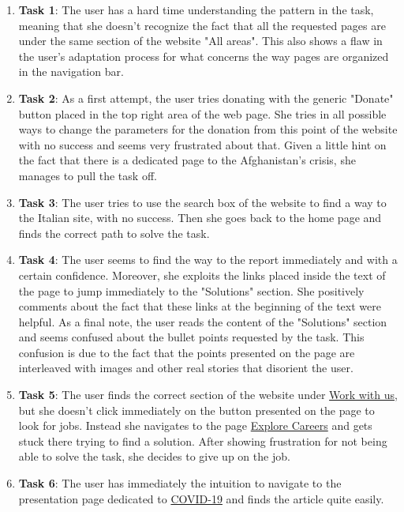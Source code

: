 \begin{enumerate}
	\item \textbf{Task 1}: The user has a hard time understanding the pattern in the task, meaning that she doesn't recognize the fact that all the requested pages are under the same section of the website "All areas". This also shows a flaw in the user's adaptation process for what concerns the way pages are organized in the navigation bar.
	\item \textbf{Task 2}: As a first attempt, the user tries donating with the generic "Donate" button placed in the top right area of the web page. She tries in all possible ways to change the parameters for the donation from this point of the website with no success and seems very frustrated about that. Given a little hint on the fact that there is a dedicated page to the Afghanistan's crisis, she manages to pull the task off.
	\item \textbf{Task 3}: The user tries to use the search box of the website to find a way to the Italian site, with no success. Then she goes back to the home page and finds the correct path to solve the task.
	\item \textbf{Task 4}: The user seems to find the way to the report immediately and with a certain confidence. Moreover, she exploits the links placed inside the text of the page to jump immediately to the "Solutions" section. She positively comments about the fact that these links at the beginning of the text were helpful. As a final note, the user reads the content of the "Solutions" section and seems confused about the bullet points requested by the task. This confusion is due to the fact that the points presented on the page are interleaved with images and other real stories that disorient the user.
	\item \textbf{Task 5}: The user finds the correct section of the website under \href{https://www.unicef.org/careers/}{Work with us}, but she doesn't click immediately on the button presented on the page to look for jobs. Instead she navigates to the page \href{https://www.unicef.org/careers/explore-careers-unicef}{Explore Careers} and gets stuck there trying to find a solution. After showing frustration for not being able to solve the task, she decides to give up on the job.
	\item \textbf{Task 6}: The user has immediately the intuition to navigate to the presentation page dedicated to \href{https://www.unicef.org/coronavirus/covid-19}{COVID-19} and finds the article quite easily.
	
\end{enumerate}






